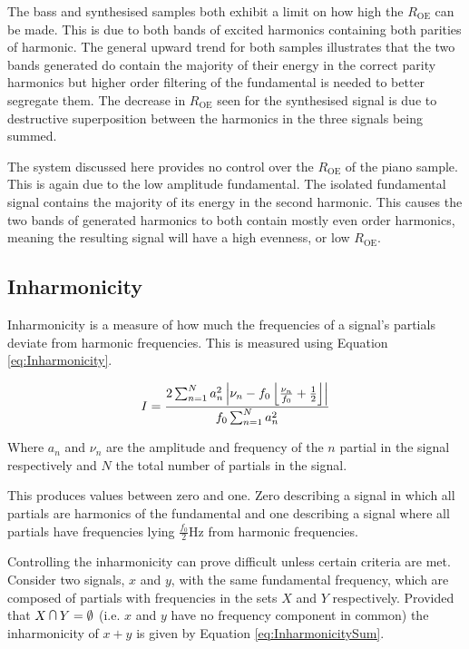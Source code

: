 			The bass and synthesised samples both exhibit a limit on how high the $R_{\textrm{OE}}$ can be
			made. This is due to both bands of excited harmonics containing both parities of harmonic.  The
			general upward trend for both samples illustrates that the two bands generated do contain the
			majority of their energy in the correct parity harmonics but higher order filtering of the
			fundamental is needed to better segregate them. The decrease in $R_{\textrm{OE}}$ seen for the
			synthesised signal is due to destructive superposition between the harmonics in the three signals
			being summed.

			The system discussed here provides no control over the $R_{\textrm{OE}}$ of the piano sample. This
			is again due to the low amplitude fundamental. The isolated fundamental signal contains the
			majority of its energy in the second harmonic. This causes the two bands of generated harmonics to
			both contain mostly even order harmonics, meaning the resulting signal will have a high evenness,
			or low $R_{\textrm{OE}}$.

	\subsection{Inharmonicity}
	\label{sec:FeatureControl-Parameterisation-Inharmonicity}
		Inharmonicity is a measure of how much the frequencies of a signal's partials deviate from harmonic
		frequencies. This is measured using Equation \ref{eq:Inharmonicity}.
		
		\begin{equation}
			I = \frac{2\sum_{n = 1}^{N}a_{n}^{2}
			           \left|\nu_{n} - f_{0}\left\lfloor\frac{\nu_{n}}{f_{0}} + \frac{1}{2}\right\rfloor\right|}
				   {f_{0}\sum_{n = 1}^{N} a_{n}^{2}}
			\label{eq:Inharmonicity}
		\end{equation}

		Where $a_{n}$ and $\nu_{n}$ are the amplitude and frequency of the $n$ partial in the signal
		respectively and $N$ the total number of partials in the signal.

		This produces values between zero and one. Zero describing a signal in which all partials are harmonics of
		the fundamental and one describing a signal where all partials have frequencies lying
		$\frac{f_{0}}{2}$Hz from harmonic frequencies.

		Controlling the inharmonicity can prove difficult unless certain criteria are met. Consider two signals,
		$x$ and $y$, with the same fundamental frequency, which are composed of partials with frequencies in the
		sets $X$ and $Y$ respectively. Provided that $X \medcap Y = \emptyset$ (i.e. $x$ and $y$ have no frequency
		component in common) the inharmonicity of $x + y$ is given by Equation \ref{eq:InharmonicitySum}.

